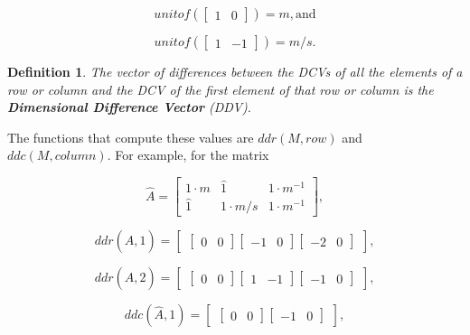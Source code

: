\documentclass[10pt,letterpaper]{article}
\newtheorem{defn}{Definition}[section]
\numberwithin{equation}{section}
\begin{document}
\[ unitof(\left[ \begin{matrix} 1 & 0 \end{matrix} \right]) = m, \mbox{and} \]

\[ unitof(\left[ \begin{matrix} 1 & -1 \end{matrix} \right]) = m/s. \]

\begin{defn}The vector of differences between the DCVs of all the
  elements of a row or column and the DCV of the first element of that
  row or column is the \textbf{Dimensional Difference Vector}
  (DDV).\end{defn}

The functions that compute these values are $ddr(M, row)$ and $ddc(M,
column)$.  For example, for the matrix

\[ \hat A = \left[ \begin{matrix} 
  1 \cdot m & \hat 1 & 1 \cdot m^{-1} \\
  \hat 1 & 1 \cdot m/s & 1 \cdot m^{-1}
 \end{matrix} \right] , \]

\[ ddr(\hat A, 1) = \left[ \begin{matrix} \left[ \begin{matrix} 0 &
        0 \end{matrix} \right] \left[ \begin{matrix} -1 &
        0 \end{matrix} \right] \left[ \begin{matrix} -2 &
        0 \end{matrix} \right] \end{matrix} \right] , \]

\[ ddr(\hat A, 2) = \left[ \begin{matrix} \left[ \begin{matrix} 0 &
        0 \end{matrix} \right] \left[ \begin{matrix} 1 &
        -1 \end{matrix} \right] \left[ \begin{matrix} -1 &
        0 \end{matrix} \right] \end{matrix} \right] , \]

\[ ddc(\hat A, 1) = \left[ \begin{matrix} \left[ \begin{matrix} 0 &
        0 \end{matrix} \right] \left[ \begin{matrix} -1 &
        0 \end{matrix} \right] \end{matrix} \right] , \]
\end{document}
